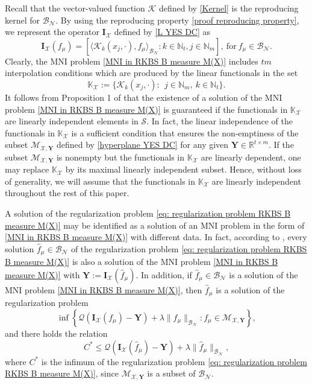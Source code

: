 \documentclass[11pt]{article}
\begin{document}
Recall that the vector-valued function $\mathcal{K}$ defined by \eqref{Kernel} is the reproducing kernel for $\mathcal{B}_{\mathcal{N}}$. By using the reproducing property \eqref{proof reproducing property}, we represent the operator $\mathbf{I}_{\mathcal{X}}$ defined by \eqref{L YES DC} as 
$$
\mathbf{I}_{\mathcal{X}}(f_\mu)=\left[\langle \mathcal{K}_k(x_j,\cdot), f_{\mu}\rangle_{\mathcal{B}_{\mathcal{N}}}: k\in\mathbb{N}_t,j\in\mathbb{N}_{m}\right],\ \mbox{for}\ f_\mu\in\mathcal{B}_{\mathcal{N}}.
$$
Clearly, the MNI problem \eqref{MNI in RKBS B measure M(X)} includes $tm$ interpolation conditions which are produced by the linear functionals in the set
$$
\mathbb{K}_\mathcal{X}:=\{\mathcal{K}_k(x_j,\cdot):  \ \ j\in\mathbb{N}_m,\ k\in\mathbb{N}_t\}.
$$
It follows from Proposition 1 of \cite{wang2021representer} that the existence of a solution of the MNI problem \eqref{MNI in RKBS B measure M(X)} is guaranteed if the functionals in $\mathbb{K}_\mathcal{X}$ are linearly independent elements in $\mathcal{S}$. In fact, the linear independence of the functionals in $\mathbb{K}_\mathcal{X}$ is a sufficient condition that ensures the non-emptiness of the subset $\mathcal{M}_{\mathcal{X},\mathbf{Y}}$ defined by \eqref{hyperplane YES DC} for any given
$\mathbf{Y}\in\mathbb{R}^{t\times m}$. If the subset $\mathcal{M}_{\mathcal{X},\mathbf{Y}}$ is nonempty but the functionals in $\mathbb{K}_\mathcal{X}$ are linearly dependent, one may replace $\mathbb{K}_\mathcal{X}$ by its maximal linearly independent subset. Hence, without loss of generality, we will assume that the functionals in $\mathbb{K}_\mathcal{X}$ are linearly independent throughout the rest of this paper. %


A solution of the regularization problem \eqref{eq: regularization problem RKBS B measure M(X)} may be identified as a solution of an MNI problem in the form of \eqref{MNI in RKBS B measure M(X)} with different data. In fact, according to \cite{wang2021representer}, every solution $\hat{f}_{\mu}\in\mathcal{B}_{\mathcal{N}}$ of the regularization problem \eqref{eq: regularization problem RKBS B measure M(X)} is also a
solution of the MNI problem \eqref{MNI in RKBS B measure M(X)} with $\mathbf{Y}:=\mathbf{I}_{\mathcal{X}}(\hat{f}_{\mu})$. In addition, if $\hat{f}_{\mu}\in\mathcal{B}_{\mathcal{N}}$ is a solution of the MNI problem \eqref{MNI in RKBS B measure M(X)}, then $\hat{f}_{\mu}$ is a solution of the regularization problem 
$$
\inf \left\{\mathcal{Q}(\mathbf{I}_{\mathcal{X}}(f_\mu)-\mathbf{Y})+\lambda\| f_\mu\|_{{\mathcal{B}_{\mathcal{N}}}}:  f_\mu\in \mathcal{M}_{\mathcal{X},\mathbf{Y}}\right\},
$$
and there holds the relation 
$$
{C^*}\leq\mathcal{Q}(\mathbf{I}_{\mathcal{X}}(\hat{f}_{\mu})-\mathbf{Y})+\lambda\| \hat{f}_{\mu}\|_{{\mathcal{B}_{\mathcal{N}}}},
$$ 
where ${C^*}$ is the infimum of the regularization problem \eqref{eq: regularization problem RKBS B measure M(X)}, since $\mathcal{M}_{\mathcal{X},\mathbf{Y}}$ is a subset of $\mathcal{B}_{\mathcal{N}}$. 
\end{document}
